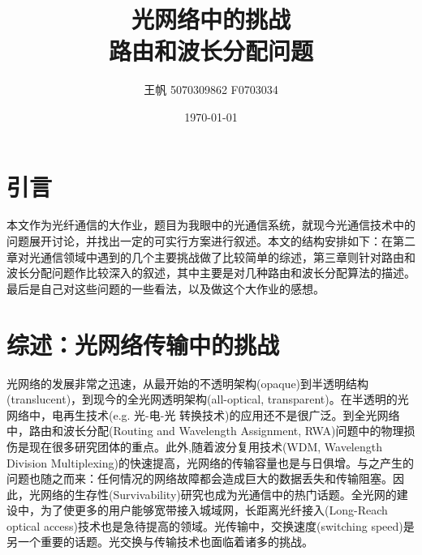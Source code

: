 \documentclass[11pt,twocolumn]{ctexart}
\begin{document}
\title{\textbf{光网络中的挑战}\\[1ex]路由和波长分配问题}
\author{王帆 5070309862 F0703034}
\date{\today}

\section{引言}
本文作为光纤通信的大作业，题目为我眼中的光通信系统，就现今光通信技术中的问题展开讨论，并找出一定的可实行方案进行叙述。本文的结构安排如下：在第二章对光通信领域中遇到的几个主要挑战做了比较简单的综述，第三章则针对路由和波长分配问题作比较深入的叙述，其中主要是对几种路由和波长分配算法的描述。\cite{1,6,8,9}最后是自己对这些问题的一些看法，以及做这个大作业的感想。

\section{综述：光网络传输中的挑战}
光网络的发展非常之迅速，从最开始的不透明架构(opaque)到半透明结构(translucent)，到现今的全光网透明架构(all-optical, transparent)。在半透明的光网络中，电再生技术(e.g. 光-电-光 转换技术)的应用还不是很广泛。到全光网络中，路由和波长分配(Routing and Wavelength Assignment, RWA)问题中的物理损伤是现在很多研究团体的重点。\cite{1,6,8,9}此外,随着波分复用技术(WDM, Wavelength Division Multiplexing)的快速提高，光网络的传输容量也是与日俱增。与之产生的问题也随之而来：任何情况的网络故障都会造成巨大的数据丢失和传输阻塞。因此，光网络的生存性(Survivability)研究也成为光通信中的热门话题。\cite{2}全光网的建设中，为了使更多的用户能够宽带接入城域网，长距离光纤接入(Long-Reach optical access)技术也是急待提高的领域。\cite{3,4}光传输中，交换速度(switching speed)是另一个重要的话题。光交换与传输技术也面临着诸多的挑战。\cite{5,7}
\end{document}

